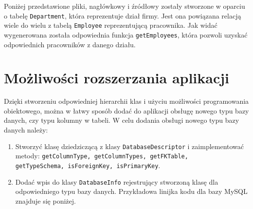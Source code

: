 \documentclass[12pt]{report}
\let\oldaddcontentsline\addcontentsline
\newcommand{\lstinputcplusplus}[2][]{{%
  \renewcommand{\lstlistingname}{C++ Code}%
  \renewcommand{\addcontentsline}[3]{\oldaddcontentsline{loc}{##2}{##3}}%
}}
\begin{document}
{Poniżej przedstawione pliki, nagłówkowy i źródłowy zostały stworzone w oparciu o tabelę {\tt Department}, która reprezentuje dział firmy. Jest ona powiązana relacją wiele do wielu z tabelą {\tt Employee} reprezentującą pracownika. Jak widać wygenerowana została odpowiednia funkcja {\tt getEmployees}, która pozwoli uzyskać odpowiednich pracowników z danego działu. 

\begin{framed}
\lstinputcplusplus[caption={QcSchemaGenerator}]{additional/department.h}
\end{framed}

\begin{framed}
\lstinputcplusplus[caption={QcSchemaGenerator}]{additional/department.cpp}
\end{framed}

\section{Możliwości rozszerzania aplikacji}

Dzięki stworzeniu odpowiedniej hierarchii klas i użyciu możliwości programowania obiektowego, można w łatwy sposób dodać do aplikacji obsługę nowego typu bazy danych, czy typu kolumny w tabeli. W celu dodania obsługi nowego typu bazy danych należy:

\begin{enumerate}
\item{Stworzyć klasę dziedziczącą z klasy {\tt DatabaseDescriptor} i zaimplementować metody: {\tt getColumnType, getColumnTypes, getFKTable,}\\ {\tt getTypeSchema, isForeignKey, isPrimaryKey}.}
\item{Dodać wpis do klasy {\tt DatabaseInfo} rejestrujący stworzoną klasę dla odpowiedniego typu bazy danych. Przykładowa linijka kodu dla bazy MySQL znajduje się poniżej.}
\end{enumerate}

}
\end{document}
